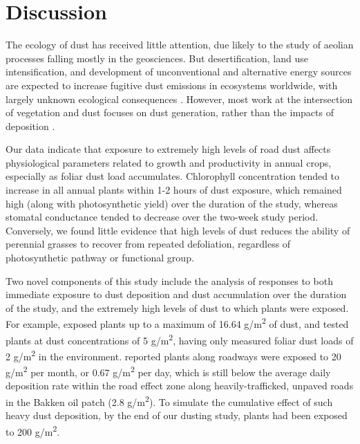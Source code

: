 \documentclass{svjour3}
\begin{document}
\section{Discussion} 

The ecology of dust has received little attention, due likely to the study of aeolian processes falling mostly in the geosciences. 
But desertification, land use intensification, and development of unconventional and alternative energy sources are expected to increase fugitive dust emissions in ecosystems worldwide, with largely unknown ecological consequences \citep{field2010}.  
However, most work at the intersection of vegetation and dust focuses on dust generation, rather than the impacts of deposition \citep[e.g.,][]{belnap2014, flagg2014,nandintsetseg2015}. 

Our data indicate that exposure to extremely high levels of road dust affects physiological parameters related to growth and productivity in annual crops, especially as foliar dust load accumulates. 
Chlorophyll concentration tended to increase in all annual plants within 1-2 hours of dust exposure, which remained high (along with photosynthetic yield) over the duration of the study, whereas stomatal conductance tended to decrease over the two-week study period.
Conversely, we found little evidence that high levels of dust reduces the ability of perennial grasses to recover from repeated defoliation, regardless of photosynthetic pathway or functional group. 

Two novel components of this study include the analysis of responses to both immediate exposure to dust deposition and dust accumulation over the duration of the study, and the extremely high levels of dust to which plants were exposed. 
For example, \citet{bao2015} exposed plants up to a maximum of 16.64 g/m\textsuperscript{2} of dust, and \citet{thompson1984} tested plants at dust concentrations of 5 g/m\textsuperscript{2}, having only measured foliar dust loads of 2 g/m\textsuperscript{2} in the environment. 
\citet{matsuki2016} reported plants along roadways were exposed to 20 g/m\textsuperscript{2} per month, or 0.67 g/m\textsuperscript{2} per day, which is still below the average daily deposition rate within the road effect zone along heavily-trafficked, unpaved roads in the Bakken oil patch (2.8 g/m\textsuperscript{2}). 
To simulate the cumulative effect of such heavy dust deposition, by the end of our dusting study, plants had been exposed to 200 g/m\textsuperscript{2}.
\end{document}
